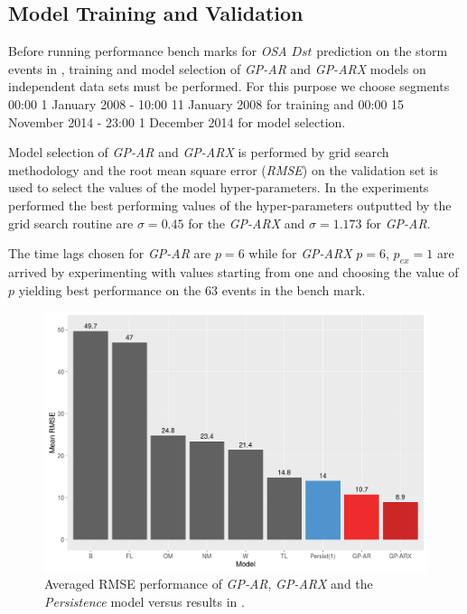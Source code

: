 \documentclass[referee,a4paper,12pt,traditabstract]{swsc}
\begin{document}
\begin{linenumbers}
\section{Model Training and Validation}

Before running performance bench marks for \emph{OSA} $Dst$ prediction on the storm events in \cite{Ji2012}, training and model selection of \emph{GP-AR} and \emph{GP-ARX} models on independent data sets must be performed. For this purpose we choose segments 00:00 1 January 2008 - 10:00 11 January 2008 for training and 00:00 15 November 2014 - 23:00 1 December 2014 for model selection.

Model selection of \emph{GP-AR} and \emph{GP-ARX} is performed by grid search methodology and the root mean square error (\emph{RMSE}) on the validation set is used to select the values of the model hyper-parameters. In the experiments performed the best performing values of the hyper-parameters outputted by the grid search routine are $\sigma = 0.45$ for the \emph{GP-ARX} and $\sigma = 1.173$ for \emph{GP-AR}. 

The time lags chosen for \emph{GP-AR} are $p = 6$ while for \emph{GP-ARX} $p=6$, $p_{ex} = 1$ are arrived by experimenting with values starting from one and choosing the value of $p$ yielding best performance on the 63 events in the bench mark.   

\begin{figure}
   \centering
   \includegraphics[width=\textwidth]{Compare_RMSE.png}
      \caption{Averaged RMSE performance of \emph{GP-AR}, \emph{GP-ARX} and the \emph{Persistence} model versus results in \citet{Ji2012}.}
         \label{fig:rmse}
   \end{figure}


\end{linenumbers}
\end{document}
